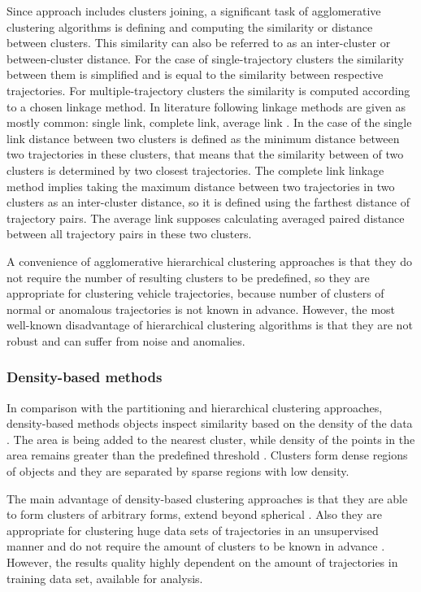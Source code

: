 Since approach includes clusters joining, a significant task of agglomerative clustering algorithms is defining and computing the similarity or distance between clusters. This similarity can also be referred to as an inter-cluster or between-cluster distance. For the case of single-trajectory clusters the similarity between them is simplified and is equal to the similarity between respective trajectories. For multiple-trajectory clusters the similarity is computed according to a chosen linkage method. In literature following linkage methods are given as mostly common: single link, complete link, average link \cite{article:23_survey_ca}\cite{inproceedings:7_related_work}. In the case of the single link distance between two clusters is defined as the minimum distance between two trajectories in these clusters, that means that the similarity between of two clusters is determined by two closest trajectories. The complete link linkage method implies taking the maximum distance between two trajectories in two clusters as an inter-cluster distance, so it is defined using the farthest distance of trajectory pairs. The average link supposes calculating averaged paired distance between all trajectory pairs in these two clusters.

A convenience of agglomerative hierarchical clustering approaches is that they do not require the number of resulting clusters to be predefined, so they are appropriate for clustering vehicle trajectories, because number of clusters of normal or anomalous trajectories is not known in advance. However, the most well-known disadvantage of hierarchical clustering algorithms is that they are not robust and can suffer from noise and anomalies. 

\subsubsection{Density-based methods}
In comparison with the partitioning and hierarchical clustering approaches, density-based methods objects inspect similarity based on the density of the data \cite{article:22_survey_dscc}. The area is being added to the nearest cluster, while density of the points in the area remains greater than the predefined threshold \cite{article:8_review_mot_cl_alg}. Clusters form dense regions of objects and they are separated by sparse regions with low density.

The main advantage of density-based clustering approaches is that they are able to form clusters of arbitrary forms, extend beyond spherical \cite{article:8_review_mot_cl_alg}. Also they are appropriate for clustering huge data sets of trajectories in an unsupervised manner and do not require the amount of clusters to be known in advance \cite{article:5_survey_tbsa}\cite{article:22_survey_dscc}. However, the results quality highly dependent on the amount of trajectories in training data set, available for analysis.

